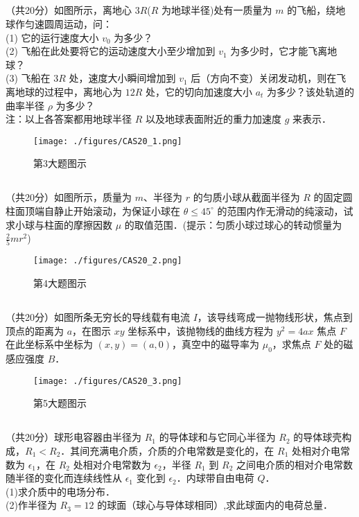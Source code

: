 \subsection{ }
（共20分）如图所示，离地心 $3R$($R$ 为地球半径)处有一质量为 $m$ 的飞船，绕地球作匀速圆周运动，问：\\
(1) 它的运行速度大小 $v_{0}$ 为多少？\\
(2) 飞船在此处要将它的运动速度大小至少增加到 $v_{1}$ 为多少时，它才能飞离地球？\\
(3) 飞船在 $3R$ 处，速度大小瞬间增加到 $v_{1}$ 后（方向不变）关闭发动机，则在飞离地球的过程中，离地心为 $12R$ 处，它的切向加速度大小 $a_{t}$ 为多少？该处轨道的曲率半径 $\rho$ 为多少？\\
注：以上各答案都用地球半径 $R$ 以及地球表面附近的重力加速度 $g$ 来表示．\\
\begin{figure}[ht]
\centering
\texttt{[image: ./figures/CAS20\_1.png]}
\caption{第3大题图示} \label{CAS20_fig1}
\end{figure}

\subsection{ }
（共20分）如图所示，质量为 $m$、半径为 $r$ 的匀质小球从截面半径为 $R$ 的固定圆柱面顶端自静止开始滚动，为保证小球在 $\theta \le 45^{\circ}$ 的范围内作无滑动的纯滚动，试求小球与柱面的摩擦因数 $\mu$ 的取值范围．(提示：匀质小球过球心的转动惯量为 $\frac{2}{5} mr^{2}$)\\
\begin{figure}[ht]
\centering
\texttt{[image: ./figures/CAS20\_2.png]}
\caption{第4大题图示} \label{CAS20_fig2}
\end{figure}

\subsection{ }
（共20分）如图所条无穷长的导线载有电流 $I$，该导线弯成一抛物线形状，焦点到顶点的距离为 $a$，在图示 $xy$ 坐标系中，该抛物线的曲线方程为 $y^{2}=4ax$ 焦点 $F$ 在此坐标系中坐标为 $(x,y)=(a,0)$，真空中的磁导率为 $\mu_{0}$，求焦点 $F$ 处的磁感应强度 $B$．\\
\begin{figure}[ht]
\centering
\texttt{[image: ./figures/CAS20\_3.png]}
\caption{第5大题图示} \label{CAS20_fig3}
\end{figure}

\subsection{ }
（共20分）球形电容器由半径为 $R_1$ 的导体球和与它同心半径为 $R_2$ 的导体球壳构成，$R_1<R_2$．其间充满电介质，介质的介电常数是变化的，在 $R_1$ 处相对介电常数为 $\epsilon_1$，在 $R_2$ 处相对介电常数为 $\epsilon_2$，半径 $R_1$ 到 $R_2$ 之间电介质的相对介电常数随半径的变化而连续线性从 $\epsilon_1$ 变化到 $\epsilon_2$．内球带自由电荷 $Q$．\\
(1)求介质中的电场分布．\\
(2)作半径为 $R_{3}=12$ 的球面（球心与导体球相同）,求此球面内的电荷总量．\\

